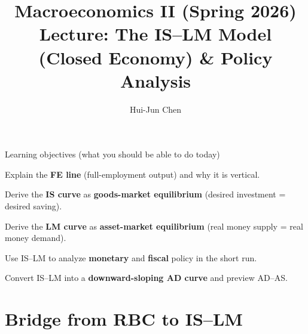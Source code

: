 \documentclass[aspectratio=169,xcolor=dvipsnames]{beamer}
\title[IS--LM]{Macroeconomics II (Spring 2026)\\\vspace{4pt}Lecture: The IS--LM Model (Closed Economy) \& Policy Analysis}
\author[Hui-Jun Chen]{Hui-Jun Chen}
\institute[]{National Tsing Hua University}
\date{}
\let\tempa\enumerate
\let\tempb\endenumerate
\renewenvironment{enumerate}{\tempa\addtolength{\itemsep}{\fill}}{\tempb}
\begin{document}
\begin{frame}
    \titlepage
{}
\end{frame}

\begin{frame}{Learning objectives (what you should be able to do today)}
\begin{enumerate}
\item Explain the \textbf{FE line} (full-employment output) and why it is vertical.
\item Derive the \textbf{IS curve} as \textbf{goods-market equilibrium} (desired investment = desired saving).
\item Derive the \textbf{LM curve} as \textbf{asset-market equilibrium} (real money supply = real money demand).
\item Use IS--LM to analyze \textbf{monetary} and \textbf{fiscal} policy in the short run.
\item Convert IS--LM into a \textbf{downward-sloping AD curve} and preview AD--AS.
\end{enumerate}
\end{frame}

\section{Bridge from RBC to IS--LM}
\end{document}
